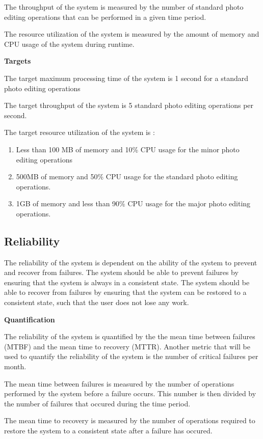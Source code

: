 \documentclass[11pt,a4paper]{article}
\begin{document}
The throughput of the system is measured by the number of standard photo editing operations that can be performed in a given time period.

The resource utilization of the system is measured by the amount of memory and CPU usage of the system during runtime.


{\bf Targets}

The target maximum processing time of the system is 1 second for a standard photo editing operations

The target throughput of the system is 5 standard photo editing operations per second.

The target resource
utilization of the system is :
\begin{enumerate}
    \item Less than 100 MB of memory and 10\% CPU usage for the minor photo editing operations
    \item 500MB of memory and 50\% CPU usage for the standard photo editing operations. 
    \item 1GB of memory and less than 90\% CPU usage for the major photo editing operations.
\end{enumerate}

\subsection*{Reliability}

The reliability of the system is dependent on the ability of the system to prevent and recover from failures.
The system should be able to prevent failures by ensuring that the system is always in a consistent state.
The system should be able to recover from failures by ensuring that the system can be restored to a consistent state, such that 
the user does not lose any work.

{\bf Quantification}

The reliability of the system is quantified by the the mean time between failures (MTBF) and the mean time to recovery (MTTR).
Another metric that will be used to quantify the reliability of the system is the number of critical failures per month.

The mean time between failures is measured by the number of operations performed by the system before a failure occurs. This number
is then divided by the number of failures that occured during the time period. 


The mean time to recovery is measured by the number of operations required to restore the system to a consistent state after a failure has occured.
\end{document}
